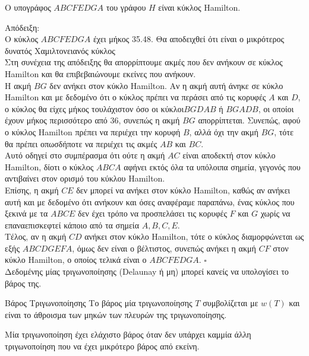 \documentclass[oneside,12pt]{book}
\theoremstyle{definition}
\begin{document}
\begin{mylemma}{}{}
	Ο υπογράφος \(ABCFEDGA\) του γράφου \(H\) είναι κύκλος Hamilton.
\end{mylemma}
Απόδειξη: \\
Ο κύκλος \(ABCFEDGA\) έχει μήκος 35.48. Θα αποδειχθεί ότι είναι ο μικρότερος δυνατός Χαμιλτονειανός κύκλος \\
Στη συνέχεια της απόδειξης θα απορρίπτουμε ακμές που δεν ανήκουν σε κύκλος Hamilton και θα επιβεβαιώνουμε εκείνες που ανήκουν. \\
Η ακμή \(BG\) δεν ανήκει στον κύκλο Hamilton. Αν η ακμή αυτή άνηκε σε κύκλο Hamilton και με δεδομένο ότι ο κύκλος πρέπει να περάσει από τις κορυφές \(A\) και \(D\), ο κύκλος θα είχες μήκος τουλάχιστον όσο οι κύκλοι\(BGDAB\) ή \(BGADB\), οι οποίοι έχουν μήκος περισσότερο από 36, συνεπώς η ακμή \(BG\) απορρίπτεται. Συνεπώς, αφού ο κύκλος Hamilton πρέπει να περιέχει την κορυφή \(B\), αλλά όχι την ακμή \(BG\), τότε θα πρέπει οπωσδήποτε να περιέχει τις ακμές \(AB\) και \(BC\). \\
Αυτό οδηγεί στο συμπέρασμα ότι ούτε η ακμή \(AC\) είναι αποδεκτή στον κύκλο Hamilton, δίοτι ο κύκλος \(ABCA\) αφήνει εκτός όλα τα υπόλοιπα σημεία, γεγονός που αντιβαίνει στον ορισμό του κύκλου Hamilton. \\
Επίσης, η ακμή \(CE\) δεν μπορεί να ανήκει στον κύκλο Hamilton, καθώς αν ανήκει αυτή και με δεδομένο ότι ανήκουν και όσες αναφέραμε παραπάνω, ένας κύκλος που ξεκινά με τα \(ABCE\) δεν έχει τρόπο να προσπελάσει τις κορυφές \(F\) και \(G\) χωρίς να επαναεπισκεφτεί κάποιο από τα σημεία \(A,B,C,E\). \\
Τέλος, αν η ακμή \(CD\) ανήκει στον κύκλο Hamilton, τότε ο κύκλος διαμορφώνεται ως εξής \(ABCDGEFA\), όμως δεν είναι ο βέλτιστος, συνεπώς ανήκει η ακμή \(CF\) στον κύκλο Hamilton, ο οποίος τελικά είναι ο \(ABCFEDGA\). \(\square\) \\

Δεδομένης μίας τριγωνοποίησης (Delaunay ή μη) μπορεί κανείς να υπολογίσει το βάρος της. \\

\begin{mydefinition}{Βάρος Τριγωνοποίησης}{}
	Το βάρος μία τριγωνοποίησης \(T\) συμβολίζεται με \(w(T)\) και είναι το άθροισμα των μηκών των πλευρών της τριγωνοποίησης.
\end{mydefinition}

Μία τριγωνοποίηση έχει ελάχιστο βάρος όταν δεν υπάρχει καμμία άλλη τριγωνοποίηση που να έχει μικρότερο βάρος από εκείνη. \\
\end{document}
